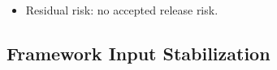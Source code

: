 \begin{itemize}
\texttt{n\allowbreak{}p\allowbreak{}m\allowbreak{} \allowbreak{}r\allowbreak{}u\allowbreak{}n\allowbreak{} \allowbreak{}d\allowbreak{}o\allowbreak{}c\allowbreak{}s\allowbreak{}:\allowbreak{}i\allowbreak{}n\allowbreak{}v\allowbreak{}e\allowbreak{}n\allowbreak{}t\allowbreak{}o\allowbreak{}r\allowbreak{}y}, \texttt{n\allowbreak{}p\allowbreak{}m\allowbreak{} \allowbreak{}a\allowbreak{}u\allowbreak{}d\allowbreak{}i\allowbreak{}t\allowbreak{} \allowbreak{}-\allowbreak{}-\allowbreak{}o\allowbreak{}m\allowbreak{}i\allowbreak{}t\allowbreak{}=\allowbreak{}d\allowbreak{}e\allowbreak{}v\allowbreak{} \allowbreak{}-\allowbreak{}-\allowbreak{}a\allowbreak{}u\allowbreak{}d\allowbreak{}i\allowbreak{}t\allowbreak{}-\allowbreak{}l\allowbreak{}e\allowbreak{}v\allowbreak{}e\allowbreak{}l\allowbreak{}=\allowbreak{}h\allowbreak{}i\allowbreak{}g\allowbreak{}h}, and the milestone-aware readiness gate from commit \texttt{1\allowbreak{}2\allowbreak{}3\allowbreak{}f\allowbreak{}4\allowbreak{}a\allowbreak{}6\allowbreak{}1}; the Release Dry Run, Tag Guard, Release workflow, tag CI, GitHub Release, and npm registry checks all passed.
\item
  Residual risk: no accepted release risk.
\end{itemize}

\subsection{Framework Input Stabilization}\label{record-261-framework-input-stabilization}

